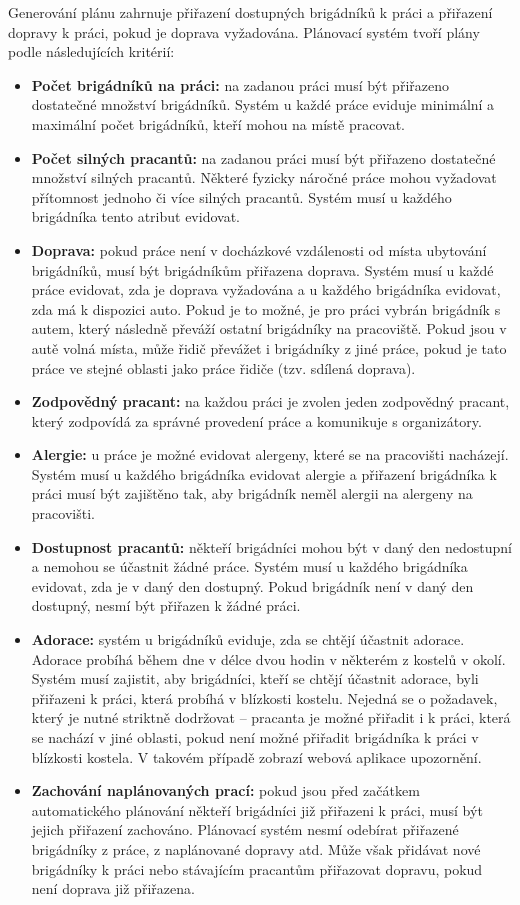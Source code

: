 Generování plánu zahrnuje přiřazení dostupných brigádníků k práci a přiřazení dopravy k práci, pokud je doprava vyžadována.
Plánovací systém tvoří plány podle následujících kritérií:
\begin{itemize}
    \item \textbf{Počet brigádníků na práci:} na zadanou práci musí být přiřazeno dostatečné množství brigádníků. Systém u každé práce eviduje minimální a maximální počet brigádníků, kteří mohou na místě pracovat. 
    \item \textbf{Počet silných pracantů:} na zadanou práci musí být přiřazeno dostatečné množství silných pracantů. Některé fyzicky náročné práce mohou vyžadovat přítomnost jednoho či více silných pracantů. Systém musí u každého brigádníka tento atribut evidovat.
    \item \textbf{Doprava:} pokud práce není v docházkové vzdálenosti od místa ubytování brigádníků, musí být brigádníkům přiřazena doprava. Systém musí u každé práce evidovat, zda je doprava vyžadována a u každého brigádníka evidovat, zda má k dispozici auto. Pokud je to možné, je pro práci vybrán brigádník s autem, který následně převáží ostatní brigádníky na pracoviště. Pokud jsou v autě volná místa, může řidič převážet i brigádníky z jiné práce, pokud je tato práce ve stejné oblasti jako práce řidiče (tzv. sdílená doprava).
    \item \textbf{Zodpovědný pracant:} na každou práci je zvolen jeden zodpovědný pracant, který zodpovídá za správné provedení práce a komunikuje s organizátory.
    \item \textbf{Alergie:} u práce je možné evidovat alergeny, které se na pracovišti nacházejí. Systém musí u každého brigádníka evidovat alergie a přiřazení brigádníka k práci musí být zajištěno tak, aby brigádník neměl alergii na alergeny na pracovišti.
    \item \textbf{Dostupnost pracantů:} někteří brigádníci mohou být v daný den nedostupní a nemohou se účastnit žádné práce. Systém musí u každého brigádníka evidovat, zda je v daný den dostupný. Pokud brigádník není v daný den dostupný, nesmí být přiřazen k žádné práci.
    \item \textbf{Adorace:} systém u brigádníků eviduje, zda se chtějí účastnit adorace. Adorace probíhá během dne v délce dvou hodin v některém z kostelů v okolí. Systém musí zajistit, aby brigádníci, kteří se chtějí účastnit adorace, byli přiřazeni k práci, která probíhá v blízkosti kostelu. Nejedná se o požadavek, který je nutné striktně dodržovat -- pracanta je možné přiřadit i k práci, která se nachází v jiné oblasti, pokud není možné přiřadit brigádníka k práci v blízkosti kostela. V takovém případě zobrazí webová aplikace upozornění.
    \item \textbf{Zachování naplánovaných prací:} pokud jsou před začátkem automatického plánování někteří brigádníci již přiřazeni k práci, musí být jejich přiřazení zachováno. Plánovací systém nesmí odebírat přiřazené brigádníky z práce, z naplánované dopravy atd. Může však přidávat nové brigádníky k práci nebo stávajícím pracantům přiřazovat dopravu, pokud není doprava již přiřazena.
\end{itemize}

